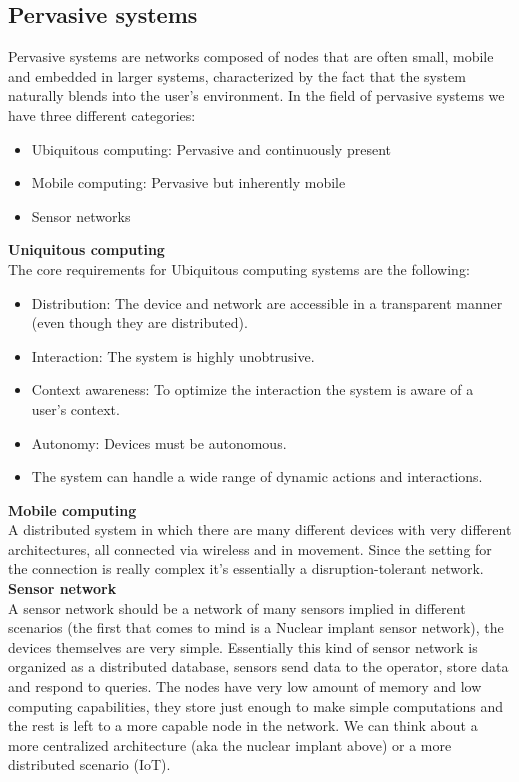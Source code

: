 \subsection{Pervasive systems}
Pervasive systems are networks composed of nodes that are often small, mobile and embedded in larger systems, characterized by the fact that the system naturally blends into the user's environment. In the field of pervasive systems we have three different categories:
\begin{itemize}
    \item Ubiquitous computing: Pervasive and continuously present
    \item Mobile computing: Pervasive but inherently mobile
    \item Sensor networks
\end{itemize}
\textbf{Uniquitous computing} \\
The core requirements for Ubiquitous computing systems are the following:
\begin{itemize}
    \item Distribution: The device and network are accessible in a transparent manner (even though they are distributed).
    \item Interaction: The system is highly unobtrusive.
    \item Context awareness: To optimize the interaction the system is aware of a user's context.
    \item Autonomy: Devices must be autonomous.
    \item The system can handle a wide range of dynamic actions and interactions.
\end{itemize}
\textbf{Mobile computing} \\
A distributed system in which there are many different devices with very different architectures, all connected via wireless and in movement. Since the setting for the connection is really complex it's essentially a disruption-tolerant network. \\
\textbf{Sensor network} \\
A sensor network should be a network of many sensors implied in different scenarios (the first that comes to mind is a Nuclear implant sensor network), the devices themselves are very simple. Essentially this kind of sensor network is organized as a distributed database, sensors send data to the operator, store data and respond to queries.
The nodes have very low amount of memory and low computing capabilities, they store just enough to make simple computations and the rest is left to a more capable node in the network. We can think about a more centralized architecture (aka the nuclear implant above) or a more distributed scenario (IoT).